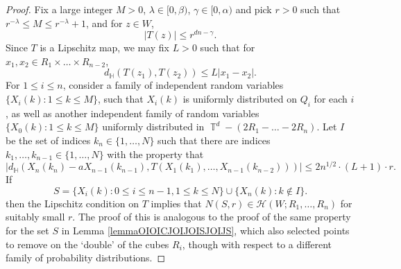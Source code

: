 \documentclass[dvipsnames,letterpaper,12pt]{article}
\numberwithin{equation}{section}
\DeclareMathOperator{\TT}{\mathbb{T}}
\numberwithin{theorem}{section}
\begin{document}
\begin{proof}
    Fix a large integer $M > 0$, $\lambda \in [0,\beta)$, $\gamma \in [0,\alpha)$ and pick $r > 0$ such that $r^{-\lambda} \leq M \leq r^{-\lambda} + 1$, and for $z \in W$,
    \[ |T(z)| \leq r^{dn - \gamma}. \]
    Since $T$ is a Lipschitz map, we may fix $L > 0$ such that for $x_1,x_2 \in R_1 \times \dots \times R_{n-2}$,
    \[ d_{\mathbb{H}}(T(z_1), T(z_2)) \leq L |x_1 - x_2|. \]
    For $1 \leq i \leq n$, consider a family of independent random variables $\{ X_i(k): 1 \leq k \leq M \}$, such that $X_i(k)$ is uniformly distributed on $Q_i$ for each $i$, as well as another independent family of random variables $\{ X_0(k): 1 \leq k \leq M \}$ uniformly distributed in $\TT^d - (2R_1 - \dots - 2R_n)$. Let $I$ be the set of indices $k_n \in \{ 1, \dots, N \}$ such that there are indices $k_1,\dots,k_{n-1} \in \{ 1, \dots, N \}$ with the property that
    \begin{equation}
        |d_{\mathbb{H}}(X_n(k_n) - a X_{n-1}(k_{n-1}), T(X_1(k_1), \dots, X_{n-1}(k_{n-2})))| \leq 2 n^{1/2} \cdot (L+1) \cdot r.
    \end{equation}
    If
    \[ S = \{ X_i(k) : 0 \leq i \leq n-1, 1 \leq k \leq N \} \cup \{ X_n(k): k \not \in I \}. \]
    then the Lipschitz condition on $T$ implies that $N(S,r) \in \mathcal{H}(W;R_1,\dots,R_n)$ for suitably small $r$. The proof of this is analogous to the proof of the same property for the set $S$ in Lemma \ref{lemmaOIOICJOIJOISJOIJS}, which also selected points to remove on the `double' of the cubes $R_i$, though with respect to a different family of probability distributions.


\end{proof}
\end{document}
